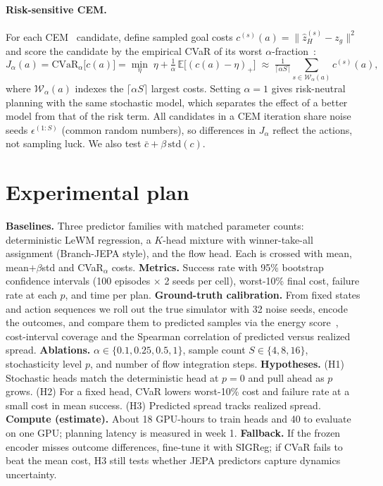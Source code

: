 \documentclass{article}
\newcommand{\E}{\mathbb{E}}
\newcommand{\cvar}{\mathrm{CVaR}}
\begin{document}
\paragraph{Risk-sensitive CEM.} For each CEM~\cite{deboer2005cem} candidate, define sampled goal costs $c^{(s)}(a)=\|\hat z^{(s)}_H-z_g\|^2$ and score the candidate by the empirical CVaR of its worst $\alpha$-fraction~\cite{rockafellar2000cvar}:
\begin{equation}
J_\alpha(a)=\cvar_\alpha\big[c(a)\big]=\min_{\eta}\;\eta+\tfrac{1}{\alpha}\,\E\big[(c(a)-\eta)_+\big]\;\approx\;\tfrac{1}{\lceil \alpha S\rceil}\textstyle\sum_{s\in\mathcal{W}_\alpha(a)}c^{(s)}(a),
\end{equation}
where $\mathcal{W}_\alpha(a)$ indexes the $\lceil\alpha S\rceil$ largest costs. Setting $\alpha=1$ gives risk-neutral planning with the same stochastic model, which separates the effect of a better model from that of the risk term. All candidates in a CEM iteration share noise seeds $\epsilon^{(1:S)}$ (common random numbers), so differences in $J_\alpha$ reflect the actions, not sampling luck. We also test $\bar c+\beta\,\mathrm{std}(c)$.

\section{Experimental plan}

\textbf{Baselines.} Three predictor families with matched parameter counts: deterministic LeWM regression, a $K$-head mixture with winner-take-all assignment (Branch-JEPA style), and the flow head. Each is crossed with mean, mean$+\beta$std and CVaR$_\alpha$ costs. \textbf{Metrics.} Success rate with 95\% bootstrap confidence intervals (100 episodes $\times$ 2 seeds per cell), worst-10\% final cost, failure rate at each $p$, and time per plan. \textbf{Ground-truth calibration.} From fixed states and action sequences we roll out the true simulator with 32 noise seeds, encode the outcomes, and compare them to predicted samples via the energy score~\cite{gneiting2007scoring}, cost-interval coverage and the Spearman correlation of predicted versus realized spread. \textbf{Ablations.} $\alpha\in\{0.1,0.25,0.5,1\}$, sample count $S\in\{4,8,16\}$, stochasticity level $p$, and number of flow integration steps. \textbf{Hypotheses.} (H1) Stochastic heads match the deterministic head at $p=0$ and pull ahead as $p$ grows. (H2) For a fixed head, CVaR lowers worst-10\% cost and failure rate at a small cost in mean success. (H3) Predicted spread tracks realized spread. \textbf{Compute (estimate).} About 18 GPU-hours to train heads and 40 to evaluate on one GPU; planning latency is measured in week 1. \textbf{Fallback.} If the frozen encoder misses outcome differences, fine-tune it with SIGReg; if CVaR fails to beat the mean cost, H3 still tests whether JEPA predictors capture dynamics uncertainty.
\end{document}
